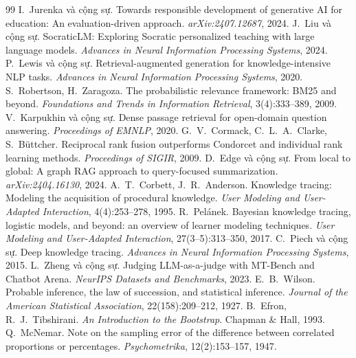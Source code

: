 \begin{thebibliography}{99}
 I.~Jurenka và cộng sự. Towards responsible development of generative AI for education: An evaluation-driven approach. \emph{arXiv:2407.12687}, 2024.
 J.~Liu và cộng sự. SocraticLM: Exploring Socratic personalized teaching with large language models. \emph{Advances in Neural Information Processing Systems}, 2024.
 P.~Lewis và cộng sự. Retrieval-augmented generation for knowledge-intensive NLP tasks. \emph{Advances in Neural Information Processing Systems}, 2020.
 S.~Robertson, H.~Zaragoza. The probabilistic relevance framework: BM25 and beyond. \emph{Foundations and Trends in Information Retrieval}, 3(4):333--389, 2009.
 V.~Karpukhin và cộng sự. Dense passage retrieval for open-domain question answering. \emph{Proceedings of EMNLP}, 2020.
 G.~V.~Cormack, C.~L.~A.~Clarke, S.~Büttcher. Reciprocal rank fusion outperforms Condorcet and individual rank learning methods. \emph{Proceedings of SIGIR}, 2009.
 D.~Edge và cộng sự. From local to global: A graph RAG approach to query-focused summarization. \emph{arXiv:2404.16130}, 2024.
 A.~T.~Corbett, J.~R.~Anderson. Knowledge tracing: Modeling the acquisition of procedural knowledge. \emph{User Modeling and User-Adapted Interaction}, 4(4):253--278, 1995.
 R.~Pelánek. Bayesian knowledge tracing, logistic models, and beyond: an overview of learner modeling techniques. \emph{User Modeling and User-Adapted Interaction}, 27(3--5):313--350, 2017.
 C.~Piech và cộng sự. Deep knowledge tracing. \emph{Advances in Neural Information Processing Systems}, 2015.
 L.~Zheng và cộng sự. Judging LLM-as-a-judge with MT-Bench and Chatbot Arena. \emph{NeurIPS Datasets and Benchmarks}, 2023.
 E.~B.~Wilson. Probable inference, the law of succession, and statistical inference. \emph{Journal of the American Statistical Association}, 22(158):209--212, 1927.
 B.~Efron, R.~J.~Tibshirani. \emph{An Introduction to the Bootstrap}. Chapman \& Hall, 1993.
 Q.~McNemar. Note on the sampling error of the difference between correlated proportions or percentages. \emph{Psychometrika}, 12(2):153--157, 1947.
\end{thebibliography}
